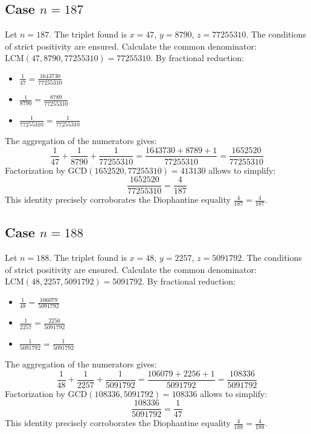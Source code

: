 \documentclass[11pt,a4paper]{article}
\begin{document}
\subsection{Case $n = 187$}
Let $n = 187$. The triplet found is $x = 47$, $y = 8790$, $z = 77255310$.
The conditions of strict positivity are ensured.
Calculate the common denominator: $\text{LCM}(47, 8790, 77255310) = 77255310$.
By fractional reduction:
\begin{itemize}
    \item $\frac{1}{47} = \frac{1643730}{77255310}$
    \item $\frac{1}{8790} = \frac{8789}{77255310}$
    \item $\frac{1}{77255310} = \frac{1}{77255310}$
\end{itemize}
The aggregation of the numerators gives:
$$ \frac{1}{47} + \frac{1}{8790} + \frac{1}{77255310} = \frac{1643730 + 8789 + 1}{77255310} = \frac{1652520}{77255310} $$
Factorization by $\text{GCD}(1652520, 77255310) = 413130$ allows to simplify:
$$ \frac{1652520}{77255310} = \frac{4}{187} $$
This identity precisely corroborates the Diophantine equality $\frac{4}{187} = \frac{4}{187}$.

\subsection{Case $n = 188$}
Let $n = 188$. The triplet found is $x = 48$, $y = 2257$, $z = 5091792$.
The conditions of strict positivity are ensured.
Calculate the common denominator: $\text{LCM}(48, 2257, 5091792) = 5091792$.
By fractional reduction:
\begin{itemize}
    \item $\frac{1}{48} = \frac{106079}{5091792}$
    \item $\frac{1}{2257} = \frac{2256}{5091792}$
    \item $\frac{1}{5091792} = \frac{1}{5091792}$
\end{itemize}
The aggregation of the numerators gives:
$$ \frac{1}{48} + \frac{1}{2257} + \frac{1}{5091792} = \frac{106079 + 2256 + 1}{5091792} = \frac{108336}{5091792} $$
Factorization by $\text{GCD}(108336, 5091792) = 108336$ allows to simplify:
$$ \frac{108336}{5091792} = \frac{1}{47} $$
This identity precisely corroborates the Diophantine equality $\frac{4}{188} = \frac{4}{188}$.
\end{document}
